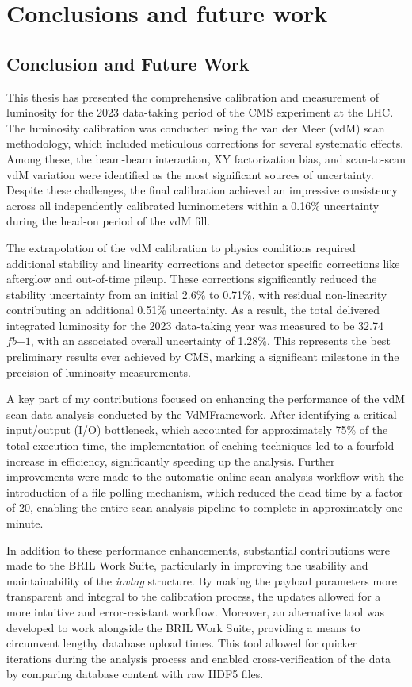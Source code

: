 \chapter{Conclusions and future work}

\section{Conclusion and Future Work}

This thesis has presented the comprehensive calibration and measurement of luminosity for the 2023 data-taking period of the CMS experiment at the LHC. The luminosity calibration was conducted using the van der Meer (vdM) scan methodology, which included meticulous corrections for several systematic effects. Among these, the beam-beam interaction, XY factorization bias, and scan-to-scan vdM variation were identified as the most significant sources of uncertainty. Despite these challenges, the final calibration achieved an impressive consistency across all independently calibrated luminometers within a 0.16\% uncertainty during the head-on period of the vdM fill. 

The extrapolation of the vdM calibration to physics conditions required additional stability and linearity corrections and detector specific corrections like afterglow and out-of-time pileup. These corrections significantly reduced the stability uncertainty from an initial 2.6\% to 0.71\%, with residual non-linearity contributing an additional 0.51\% uncertainty. As a result, the total delivered integrated luminosity for the 2023 data-taking year was measured to be 32.74 $fb{-1}$, with an associated overall uncertainty of 1.28\%. This represents the best preliminary results ever achieved by CMS, marking a significant milestone in the precision of luminosity measurements.

A key part of my contributions focused on enhancing the performance of the vdM scan data analysis conducted by the VdMFramework. After identifying a critical input/output (I/O) bottleneck, which accounted for approximately 75\% of the total execution time, the implementation of caching techniques led to a fourfold increase in efficiency, significantly speeding up the analysis. Further improvements were made to the automatic online scan analysis workflow with the introduction of a file polling mechanism, which reduced the dead time by a factor of 20, enabling the entire scan analysis pipeline to complete in approximately one minute.

In addition to these performance enhancements, substantial contributions were made to the BRIL Work Suite, particularly in improving the usability and maintainability of the \textit{iovtag} structure. By making the payload parameters more transparent and integral to the calibration process, the updates allowed for a more intuitive and error-resistant workflow. Moreover, an alternative tool was developed to work alongside the BRIL Work Suite, providing a means to circumvent lengthy database upload times. This tool allowed for quicker iterations during the analysis process and enabled cross-verification of the data by comparing database content with raw HDF5 files.

